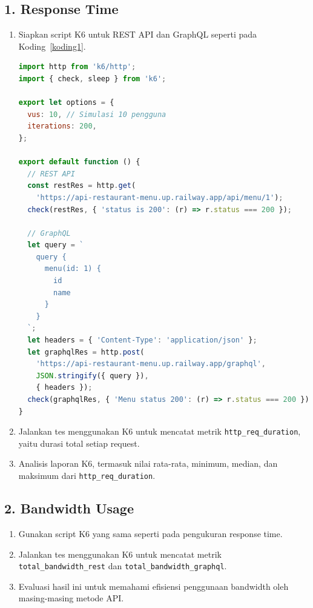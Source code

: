 \documentclass[
 manuscript=article,  %
  layout=publish, 
  year=2024, 
  month= Februari, %
  volume=8,
  number=1 
]{JIKO}
\begin{document}
\subsection*{1. Response Time}

\begin{enumerate}[label=\alph*., leftmargin=2em]
  \item Siapkan script K6 untuk REST API dan GraphQL seperti pada Koding~\ref{koding1}.

\begin{lstlisting}[language=JavaScript, caption=Koding 1. Script pengujian GraphQL dan REST API, label={koding1}, captionpos=b]
import http from 'k6/http';
import { check, sleep } from 'k6';

export let options = {
  vus: 10, // Simulasi 10 pengguna
  iterations: 200,
};

export default function () {
  // REST API
  const restRes = http.get(
    'https://api-restaurant-menu.up.railway.app/api/menu/1');
  check(restRes, { 'status is 200': (r) => r.status === 200 });

  // GraphQL
  let query = `
    query {
      menu(id: 1) {
        id
        name
      }
    }
  `;
  let headers = { 'Content-Type': 'application/json' };
  let graphqlRes = http.post(
    'https://api-restaurant-menu.up.railway.app/graphql',
    JSON.stringify({ query }),
    { headers });
  check(graphqlRes, { 'Menu status 200': (r) => r.status === 200 });
}
\end{lstlisting}


  \item Jalankan tes menggunakan K6 untuk mencatat metrik \texttt{http\_req\_duration}, yaitu durasi total setiap request.
  \item Analisis laporan K6, termasuk nilai rata-rata, minimum, median, dan maksimum dari \texttt{http\_req\_duration}.
\end{enumerate}

\vspace{1em}
\subsection*{2. Bandwidth Usage}

\begin{enumerate}[label=\alph*., leftmargin=2em]
  \item Gunakan script K6 yang sama seperti pada pengukuran response time.
  \item Jalankan tes menggunakan K6 untuk mencatat metrik \texttt{total\_bandwidth\_rest} dan \texttt{total\_bandwidth\_graphql}.
  \item Evaluasi hasil ini untuk memahami efisiensi penggunaan bandwidth oleh masing-masing metode API.
\end{enumerate}
\end{document}
